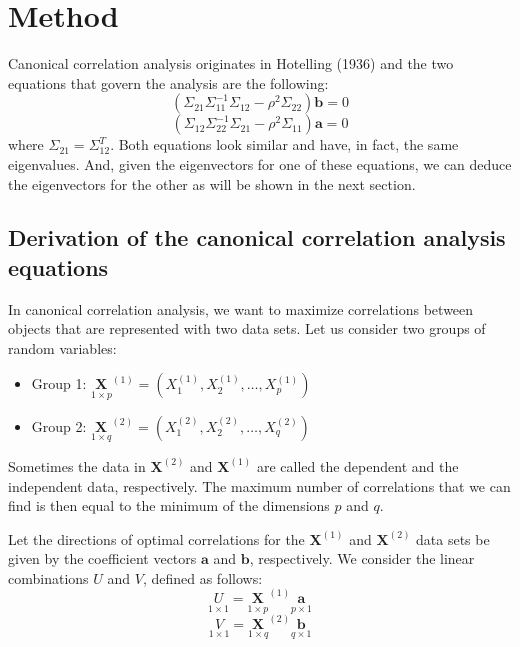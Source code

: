 \section{Method}
Canonical correlation analysis originates in Hotelling (1936) and the two equations that govern the analysis are the following:
\begin{equation} \label{eq:cca_final_b}
    (\Sigma_{21} \Sigma_{11}^{-1} \Sigma_{12} - \rho^2 \Sigma_{22})\mathbf{b} = 0
\end{equation}
\begin{equation} \label{eq:cca_final_a}
    (\Sigma_{12} \Sigma_{22}^{-1} \Sigma_{21} - \rho^2 \Sigma_{11})\mathbf{a} = 0
\end{equation}
where $\Sigma_{21} = \Sigma_{12}^T$. Both equations look similar and have, in fact, the same eigenvalues. And, given the eigenvectors for one of these equations, we can deduce the eigenvectors for the other as will be shown in the next section.

\subsection{Derivation of the canonical correlation analysis equations}
In canonical correlation analysis, we want to maximize correlations between objects that are represented with two data sets. Let us consider two groups of random variables:
\begin{itemize}
    \item Group 1: $\underset{1 \times p}{\mathbf{X}}^{(1)} = (X_1^{(1)}, X_2^{(1)}, \dots, X_p^{(1)})$
    \item Group 2: $\underset{1 \times q}{\mathbf{X}}^{(2)} = (X_1^{(2)}, X_2^{(2)}, \dots, X_q^{(2)})$
\end{itemize}
Sometimes the data in $\mathbf{X}^{(2)}$ and $\mathbf{X}^{(1)}$ are called the dependent and the independent data, respectively. The maximum number of correlations that we can find is then equal to the minimum of the dimensions $p$ and $q$.

Let the directions of optimal correlations for the $\mathbf{X}^{(1)}$ and $\mathbf{X}^{(2)}$ data sets be given by the coefficient vectors $\mathbf{a}$ and $\mathbf{b}$, respectively. We consider the linear combinations $U$ and $V$, defined as follows:
\begin{equation} \label{eq:U_def}
    \underset{1 \times 1}U =  \underset{1 \times p}{\mathbf{X}}^{(1)}\underset{p \times 1} {\mathbf{a}}
\end{equation}
\begin{equation} \label{eq:V_def}
    \underset{1 \times 1}V =  \underset{1 \times q}{\mathbf{X}}^{(2)}\underset{q \times 1} {\mathbf{b}}
\end{equation}

